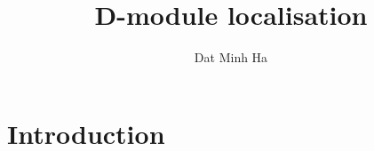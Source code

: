 

\setcounter{section}{-1}





    \title{D-module localisation}
    
    \author{Dat Minh Ha}
    \maketitle
    
    \begin{abstract}
    
    \end{abstract}
    
    {
    \hypersetup{} 
    \tableofcontents %
    }

    \section{Introduction}

    

    
    
    \printbibliography

